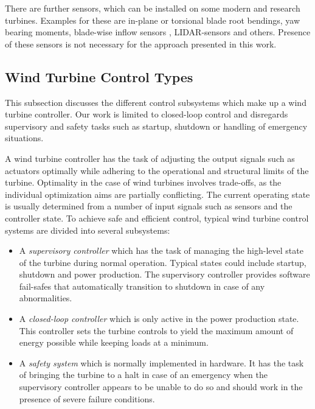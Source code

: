 There are further sensors, which can be installed on some modern and research turbines. Examples for these are in-plane or torsional blade root bendings, yaw bearing moments, blade-wise inflow sensors \cite{jonesOvercomingFundamentalLimitations2018}, LIDAR-sensors \cite{bossanyiWindTurbineControl2014} and others. Presence of these sensors is not necessary for the approach presented in this work.

\subsection{Wind Turbine Control Types}

\begin{summary}
This subsection discusses the different control subsystems which make up a wind turbine controller. Our work is limited to closed-loop control and disregards supervisory and safety tasks such as startup, shutdown or handling of emergency situations.
\end{summary}

A wind turbine controller has the task of adjusting the output signals such as actuators optimally while adhering to the operational and structural limits of the turbine. Optimality in the case of wind turbines involves trade-offs, as the individual optimization aims are partially conflicting. The current operating state is usually determined from a number of input signals such as sensors and the controller state. To achieve safe and efficient control, typical wind turbine control systems are divided into several subsystems: \cite[Chapter 8.1]{burtonWindEnergyHandbook2011}

\begin{itemize}
  \item A \textit{supervisory controller} which has the task of managing the high-level state of the turbine during normal operation. Typical states could include startup, shutdown and power production. The supervisory controller provides software fail-safes that automatically transition to shutdown in case of any abnormalities.
  \item A \textit{closed-loop controller} which is only active in the power production state. This controller sets the turbine controls to yield the maximum amount of energy possible while keeping loads at a minimum.
  \item A \textit{safety system} which is normally implemented in hardware. It has the task of bringing the turbine to a halt in case of an emergency when the supervisory controller appears to be unable to do so and should work in the presence of severe failure conditions.
\end{itemize}

